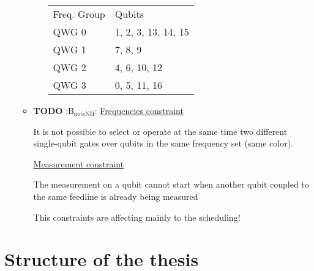 \begin{itemize}
\begin{itemize}
\begin{itemize}
\begin{center}
\begin{tabular}{ll}
 & \\
\hline
Freq. Group & Qubits\\
\hline
\cellcolor{red!25} QWG 0 & \cellcolor{red!25} 1, 2, 3, 13, 14, 15\\
\cellcolor{qpink!25} QWG 1 & \cellcolor{qpink!25} 7, 8, 9\\
\cellcolor{green!25} QWG 2 & \cellcolor{green!25} 4, 6, 10, 12\\
\cellcolor{cyan!25} QWG 3 & \cellcolor{cyan!25} 0, 5, 11, 16\\
\hline
\end{tabular}
\end{center}
\end{itemize}

\item {\bfseries\sffamily TODO} :B\(_{\text{noteNH}}\):
\label{sec:org8ddbe0d}
\uline{Frequencies constraint}

It is not possible to select or operate at the same time two different single-qubit gates over qubits in the same frequency set (same color).

\uline{Measurement constraint}

The measurement on a qubit cannot start when
 another qubit coupled to the same feedline is already being measured

This constraints are affecting mainly to the scheduling!
\end{itemize}
\end{itemize}

\section*{Structure of the thesis}
\label{sec:orgee916d1}
